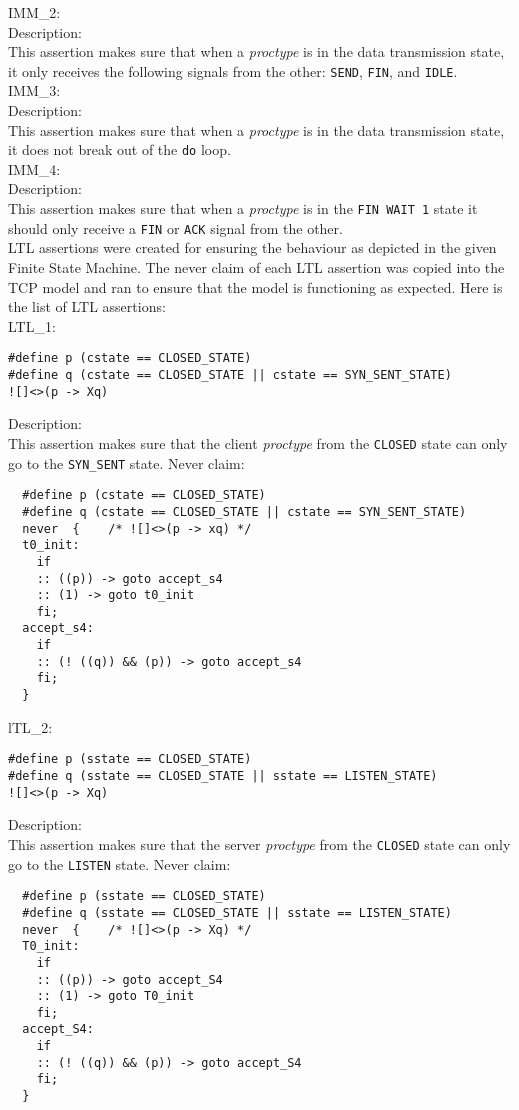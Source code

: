\documentclass{WigReport}
\begin{document}
IMM\_2:\\
Description:\\
This assertion makes sure that when a \textit{proctype} is in the data transmission state, it only receives the following signals from the other: \verb|SEND|, \verb|FIN|, and \verb|IDLE|.
\\

IMM\_3:\\
Description:\\
This assertion makes sure that when a \textit{proctype} is in the data transmission state, it does not break out of the \verb|do| loop.
\\

IMM\_4:\\
Description:\\
This assertion makes sure that when a \textit{proctype} is in the \verb|FIN WAIT 1| state it should only receive a \verb|FIN| or \verb|ACK| signal from the other.
\\

LTL assertions were created for ensuring the behaviour as depicted in the given Finite State Machine. The never claim of each LTL assertion was copied into the TCP model and ran to ensure that the model is functioning as expected. Here is the list of LTL assertions:
\\

LTL\_1:\\
\begin{lstlisting}
#define p (cstate == CLOSED_STATE)
#define q (cstate == CLOSED_STATE || cstate == SYN_SENT_STATE)
![]<>(p -> Xq)
\end{lstlisting}
Description:\\
This assertion makes sure that the client \textit{proctype} from the \verb|CLOSED| state can only go to the \verb|SYN_SENT| state.
Never claim:\\
\begin{lstlisting}
  #define p (cstate == CLOSED_STATE)
  #define q (cstate == CLOSED_STATE || cstate == SYN_SENT_STATE)
  never  {    /* ![]<>(p -> xq) */
  t0_init:
    if
    :: ((p)) -> goto accept_s4
    :: (1) -> goto t0_init
    fi;
  accept_s4:
    if
    :: (! ((q)) && (p)) -> goto accept_s4
    fi;
  }
\end{lstlisting}

lTL\_2:\\
\begin{lstlisting}
#define p (sstate == CLOSED_STATE)
#define q (sstate == CLOSED_STATE || sstate == LISTEN_STATE)
![]<>(p -> Xq)
\end{lstlisting}
Description:\\
This assertion makes sure that the server \textit{proctype} from the
\verb|CLOSED| state can only go to the \verb|LISTEN| state.
Never claim:\\
\begin{lstlisting}
  #define p (sstate == CLOSED_STATE)
  #define q (sstate == CLOSED_STATE || sstate == LISTEN_STATE)
  never  {    /* ![]<>(p -> Xq) */
  T0_init:
    if
    :: ((p)) -> goto accept_S4
    :: (1) -> goto T0_init
    fi;
  accept_S4:
    if
    :: (! ((q)) && (p)) -> goto accept_S4
    fi;
  }
\end{lstlisting}
\end{document}
